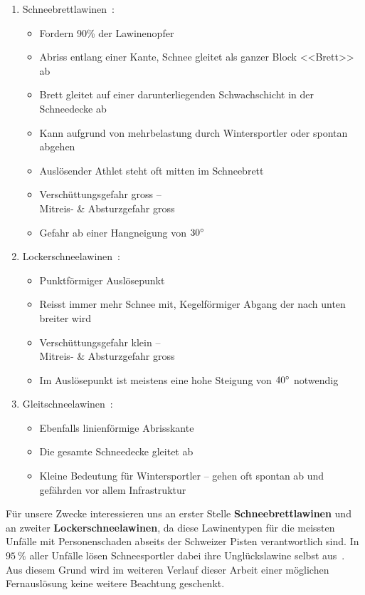 \begin{enumerate}
  \item Schneebrettlawinen~\cite{sacbergspwinter}\cite{slfLawinentypen}:
  \begin{itemize}
    \item Fordern 90\% der Lawinenopfer
    \item Abriss entlang einer Kante, Schnee gleitet als ganzer Block <<Brett>> ab
    \item Brett gleitet auf einer darunterliegenden Schwachschicht in der Schneedecke ab
    \item Kann aufgrund von mehrbelastung durch Wintersportler oder spontan abgehen
    \item Auslösender Athlet steht oft mitten im Schneebrett
    \item Verschüttungsgefahr gross –\\ Mitreis- \& Absturzgefahr gross
    \item Gefahr ab einer Hangneigung von $30\degree$
  \end{itemize}
  \columnbreak{}
    
  \item Lockerschneelawinen~\cite{sacbergspwinter}\cite{slfLawinentypen}:
  \begin{itemize}
    \item Punktförmiger Auslösepunkt
    \item Reisst immer mehr Schnee mit, Kegelförmiger Abgang der nach unten breiter wird
    \item Verschüttungsgefahr klein –\\ Mitreis- \& Absturzgefahr gross
    \item Im Auslösepunkt ist meistens eine hohe Steigung von $40\degree$ notwendig
  \end{itemize}

  \item Gleitschneelawinen~\cite{sacbergspwinter}\cite{slfLawinentypen}:
  \begin{itemize}
    \item Ebenfalls linienförmige Abrisskante
    \item Die gesamte Schneedecke gleitet ab
    \item Kleine Bedeutung für Wintersportler – gehen oft spontan ab und gefährden vor allem Infrastruktur
  \end{itemize}
\end{enumerate}
Für unsere Zwecke interessieren uns an erster Stelle \textbf{Schneebrettlawinen} und an zweiter \textbf{Lockerschneelawinen}, da diese Lawinentypen für die meissten Unfälle mit Personenschaden abseits der Schweizer Pisten verantwortlich sind. In $\qty{95}{\percent}$ aller Unfälle lösen Schneesportler dabei ihre Unglückslawine selbst aus~\cite{ortovoxlabsnow}. Aus diesem Grund wird im weiteren Verlauf dieser Arbeit einer möglichen Fernauslösung keine weitere Beachtung geschenkt.

